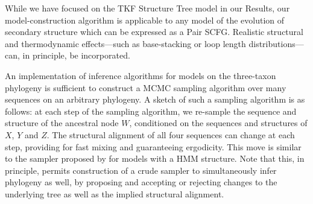 \documentclass[10pt]{article}
\begin{document}


While we have focused on the TKF Structure Tree model in our Results,
our model-construction algorithm is applicable to any model of the evolution of secondary
structure which can be expressed as a Pair SCFG.
Realistic structural and thermodynamic effects---such as base-stacking
or loop length distributions---can, in principle, be incorporated.

An implementation of inference algorithms for models on the three-taxon phylogeny
is sufficient to construct a MCMC sampling algorithm
over many sequences on an arbitrary phylogeny.
A sketch of such a sampling algorithm is as follows:
at each step of the sampling algorithm, we re-sample the sequence
and structure of the ancestral node $W$,
conditioned on the sequences and structures of $X$, $Y$ and $Z$.
The structural alignment of all four sequences can change at each step,
providing for fast mixing and guaranteeing ergodicity.
This move is similar to the sampler proposed by \cite{JensenHein2002} for 
models with a HMM structure.
Note that this, in principle, permits construction of a crude sampler
to simultaneously infer phylogeny as well, by proposing and accepting
or rejecting changes to the underlying tree as well as the implied
structural alignment.
\end{document}
